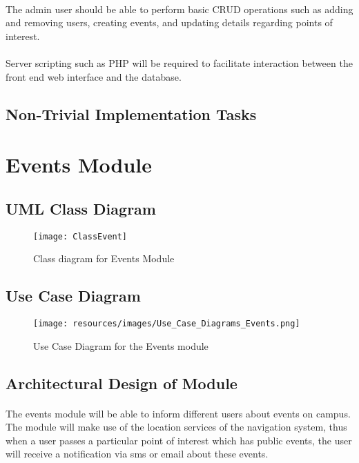 \documentclass{article}
\begin{document}
\paragraph{}The admin user should be able to perform basic CRUD operations such as adding and removing users, creating events, and updating details regarding points of interest. 

\paragraph{}Server scripting such as PHP will be required to facilitate interaction between the front end web interface and the database.

\subsection{Non-Trivial Implementation Tasks}



\section{Events Module}
\subsection{UML Class Diagram}

\begin{figure}[H]
\centering
\texttt{[image: ClassEvent]}
\caption{Class diagram for Events Module}
\end{figure}

\subsection {Use Case Diagram}

\begin{figure}[H]
\centering
\texttt{[image: resources/images/Use\_Case\_Diagrams\_Events.png]}
\caption{Use Case Diagram for the Events module}
\end{figure}

\subsection{Architectural Design of Module}
\paragraph{}The events module will be able to inform different users about events on campus. The module will make use of the location services of the navigation system, thus when a user passes a particular point of interest which has public events, the user will receive a notification via sms or email about these events. 
\end{document}
